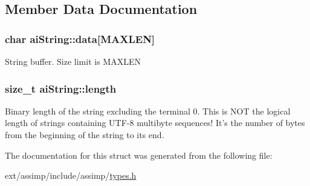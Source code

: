 \subsection{Member Data Documentation}
\hypertarget{structai_string_aa90b1da7d347a3dcca0a95061e6ea41d}{
\subsubsection[{data}]{\setlength{\rightskip}{0pt plus 5cm}char ai\-String\-::data\mbox{[}{\bf M\-A\-X\-L\-E\-N}\mbox{]}}}\label{structai_string_aa90b1da7d347a3dcca0a95061e6ea41d}
String buffer. Size limit is M\-A\-X\-L\-E\-N \hypertarget{structai_string_a7d77c2031ff0340746aa046f7fbcf313}{
\subsubsection[{length}]{\setlength{\rightskip}{0pt plus 5cm}size\-\_\-t ai\-String\-::length}}\label{structai_string_a7d77c2031ff0340746aa046f7fbcf313}
Binary length of the string excluding the terminal 0. This is N\-O\-T the logical length of strings containing U\-T\-F-\/8 multibyte sequences! It's the number of bytes from the beginning of the string to its end. 

The documentation for this struct was generated from the following file\-:\begin{DoxyCompactItemize}
\item 
ext/assimp/include/assimp/\hyperlink{types_8h}{types.\-h}\end{DoxyCompactItemize}
